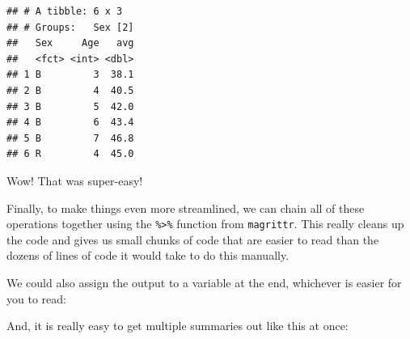 \documentclass[
]{book}
\newenvironment{Shaded}{\begin{snugshade}}{\end{snugshade}}
\newcommand{\CommentTok}[1]{\textcolor[rgb]{0.56,0.35,0.01}{\textit{#1}}}
\newcommand{\DataTypeTok}[1]{\textcolor[rgb]{0.13,0.29,0.53}{#1}}
\newcommand{\KeywordTok}[1]{\textcolor[rgb]{0.13,0.29,0.53}{\textbf{#1}}}
\newcommand{\NormalTok}[1]{#1}
\newcommand{\OperatorTok}[1]{\textcolor[rgb]{0.81,0.36,0.00}{\textbf{#1}}}
\newcommand{\StringTok}[1]{\textcolor[rgb]{0.31,0.60,0.02}{#1}}
\begin{document}
\begin{verbatim}
## # A tibble: 6 x 3
## # Groups:   Sex [2]
##   Sex     Age   avg
##   <fct> <int> <dbl>
## 1 B         3  38.1
## 2 B         4  40.5
## 3 B         5  42.0
## 4 B         6  43.4
## 5 B         7  46.8
## 6 R         4  45.0
\end{verbatim}

Wow! That was super-easy!

Finally, to make things even more streamlined, we can chain all of these operations together using the \texttt{\%\textgreater{}\%} function from \texttt{magrittr}. This really cleans up the code and gives us small chunks of code that are easier to read than the dozens of lines of code it would take to do this manually.

\begin{Shaded}
\end{Shaded}

We could also assign the output to a variable at the end, whichever is easier for you to read:

\begin{Shaded}
\end{Shaded}

And, it is really easy to get multiple summaries out like this at once:

\begin{Shaded}
\end{Shaded}
\end{document}
